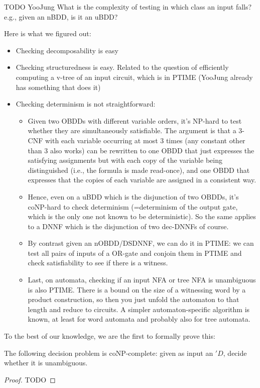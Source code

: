 TODO YooJung
What is the complexity of testing in which class an input falls? e.g., given an nBDD, is it an uBDD?

Here is what we figured out:

\begin{itemize}
\item Checking decomposability is easy
\item Checking structuredness is easy. Related to the question of efficiently computing a v-tree of an input circuit, which is in PTIME (YooJung already has something that does it)
\item Checking determinism is not straightforward:
    \begin{itemize}
        \item Given two OBDDs with different variable orders, it's NP-hard to test whether they are simultaneously satisfiable. The argument is that a 3-CNF with each variable occurring at most 3 times (any constant other than 3 also works) can be rewritten to one OBDD that just expresses the satisfying assignments but with each copy of the variable being distinguished (i.e., the formula is made read-once), and one OBDD that expresses that the copies of each variable are assigned in a consistent way.
        \item Hence, even on a uBDD which is the disjunction of two OBDDs, it's coNP-hard to check determinism (=determinism of the output gate, which is the only one not known to be deterministic). So the same applies to a DNNF which is the disjunction of two dec-DNNFs of course.
        \item By contrast given an nOBDD/DSDNNF, we can do it in PTIME: we can test all pairs of inputs of a OR-gate and conjoin them in PTIME and check satisfiability to see if there is a witness.
        \item Last, on automata, checking if an input NFA or tree NFA is unambiguous is also PTIME. There is a bound on the size of a witnessing word by a product construction, so then you just unfold the automaton to that length and reduce to circuits. A simpler automaton-specific algorithm is known, at least for word automata and probably also for tree automata.
    \end{itemize}
\end{itemize}

To the best of our knowledge, we are the first to formally prove this:

\begin{proposition}
The following decision problem is
coNP-complete: given as input an \nfbdd $'D$,
decide whether it is unambiguous.
\end{proposition}
\begin{proof}
  TODO
\end{proof}

